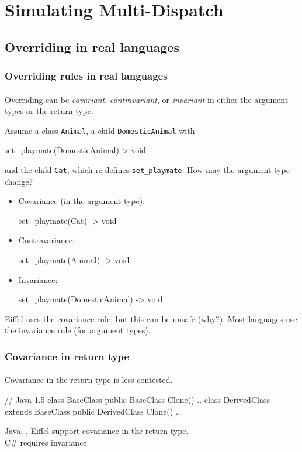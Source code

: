 \documentclass{beamer}
\begin{document}
\section{Simulating Multi-Dispatch}

\subsection{Overriding in real languages}

\begin{frame}[fragile]
\frametitle{Overriding rules in real languages}
\framesubtitle{}
Overriding can be \textit{covariant}, 
\textit{contravariant}, or \textit{invariant} in either
the argument types or the return type.
\bigskip


Assume a class \texttt{Animal}, a child \texttt{DomesticAnimal} with 
\begin{cplus3}
       set_playmate(DomesticAnimal)->  void 
\end{cplus3}

and the child \texttt{Cat},
which re-defines \texttt{set_playmate}. 
How may the argument type change?%
\begin{itemize}
\item Covariance (in the argument type):
\begin{cplus3}
 set_playmate(Cat) -> void
\end{cplus3}
 \item Contravariance:
\begin{cplus3}
 set_playmate(Animal) -> void
\end{cplus3}
  \item Invariance: 
\begin{cplus3}
 set_playmate(DomesticAnimal) -> void
\end{cplus3}


\end{itemize}
Eiffel uses the covariance rule; but this can be unsafe (why?).
Most languages use the invariance rule (for argument types). 
\end{frame}

\begin{frame}[fragile]
\frametitle{Covariance in return type}
\framesubtitle{}
Covariance in the return type is less contested.
\bigskip

\begin{cplus3}
// Java 1.5
class BaseClass {
    public BaseClass Clone() {..}
}
class DerivedClass extends BaseClass {
    public DerivedClass Clone() {..}
}
\end{cplus3}
Java, \Cpp, Eiffel support covariance in the return type.\\
C\# requires invariance. 
\end{frame}
\end{document}
